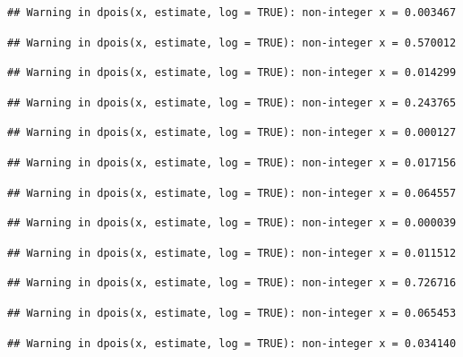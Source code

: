 \documentclass[]{article}
\begin{document}
\begin{verbatim}
## Warning in dpois(x, estimate, log = TRUE): non-integer x = 0.003467
\end{verbatim}

\begin{verbatim}
## Warning in dpois(x, estimate, log = TRUE): non-integer x = 0.570012
\end{verbatim}

\begin{verbatim}
## Warning in dpois(x, estimate, log = TRUE): non-integer x = 0.014299
\end{verbatim}

\begin{verbatim}
## Warning in dpois(x, estimate, log = TRUE): non-integer x = 0.243765
\end{verbatim}

\begin{verbatim}
## Warning in dpois(x, estimate, log = TRUE): non-integer x = 0.000127
\end{verbatim}

\begin{verbatim}
## Warning in dpois(x, estimate, log = TRUE): non-integer x = 0.017156
\end{verbatim}

\begin{verbatim}
## Warning in dpois(x, estimate, log = TRUE): non-integer x = 0.064557
\end{verbatim}

\begin{verbatim}
## Warning in dpois(x, estimate, log = TRUE): non-integer x = 0.000039
\end{verbatim}

\begin{verbatim}
## Warning in dpois(x, estimate, log = TRUE): non-integer x = 0.011512
\end{verbatim}

\begin{verbatim}
## Warning in dpois(x, estimate, log = TRUE): non-integer x = 0.726716
\end{verbatim}

\begin{verbatim}
## Warning in dpois(x, estimate, log = TRUE): non-integer x = 0.065453
\end{verbatim}

\begin{verbatim}
## Warning in dpois(x, estimate, log = TRUE): non-integer x = 0.034140
\end{verbatim}
\end{document}
